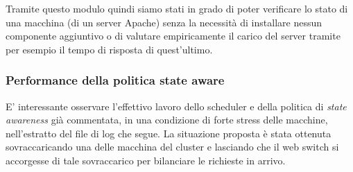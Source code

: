 \documentclass[italian]{tktltiki2}
\begin{document}
Tramite questo modulo quindi siamo stati in grado di poter verificare lo stato di una macchina (di un server Apache) senza la necessità di installare nessun componente aggiuntivo o di valutare empiricamente il carico del server tramite per esempio il tempo di risposta di quest'ultimo.

\subsubsection{Performance della politica state aware}
E' interessante osservare l'effettivo lavoro dello scheduler e della politica di \emph{state awareness} già commentata, in una condizione di forte stress delle macchine, nell'estratto del file di log che segue. La situazione proposta è stata ottenuta sovraccaricando una delle macchina del cluster e lasciando che il web switch si accorgesse di tale sovraccarico per bilanciare le richieste in arrivo.
\end{document}
